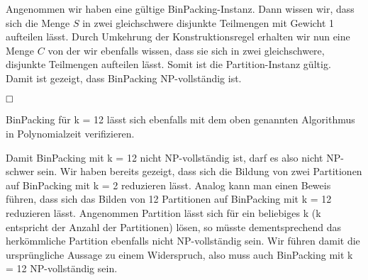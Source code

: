 \documentclass[12pt]{scrartcl}%
\theoremstyle{nonumberplain}
\begin{document}
Angenommen wir haben eine gültige {\sc BinPacking}-Instanz. Dann wissen wir, dass sich die Menge $S$ in zwei gleichschwere disjunkte Teilmengen mit Gewicht 1 aufteilen lässt. Durch Umkehrung der Konstruktionsregel erhalten wir nun eine Menge $C$ von der wir ebenfalls wissen, dass sie sich in zwei gleichschwere, disjunkte Teilmengen aufteilen lässt. Somit ist die {\sc Partition}-Instanz gültig.\\

Damit ist gezeigt, dass {\sc BinPacking} NP-vollständig ist.

$\hfill \square$

{\sc BinPacking} für k = 12 lässt sich ebenfalls mit dem oben genannten Algorithmus in Polynomialzeit verifizieren.

Damit {\sc BinPacking} mit k = 12 nicht NP-vollständig ist, darf es also nicht NP-schwer sein. Wir haben bereits gezeigt, dass sich die Bildung von zwei Partitionen auf {\sc BinPacking} mit k = 2 reduzieren lässt. Analog kann man einen Beweis führen, dass sich das Bilden von 12 Partitionen auf {\sc BinPacking} mit k = 12 reduzieren lässt. Angenommen {\sc Partition} lässt sich für ein beliebiges k (k entspricht der Anzahl der Partitionen) lösen, so müsste dementsprechend das herkömmliche {\sc Partition} ebenfalls nicht NP-vollständig sein. Wir führen damit die ursprüngliche Aussage zu einem Widerspruch, also muss auch {\sc BinPacking} mit k = 12 NP-vollständig sein.
\end{document}
